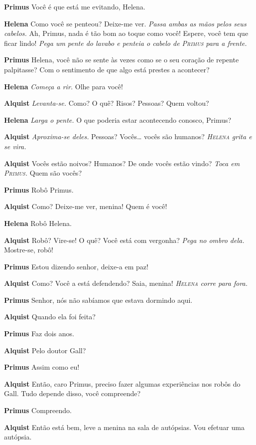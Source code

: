 \textbf{Primus} Você é que está me evitando, Helena.

\textbf{Helena} Como você se penteou? Deixe-me ver. \emph{Passa ambas as mãos pelos
seus cabelos.} Ah, Primus, nada é tão bom ao toque como você! Espere, você tem
que ficar lindo!
\emph{Pega um pente do lavabo e penteia o cabelo de \textsc{Primus} para a frente.}

\textbf{Primus} Helena, você não se sente às vezes como se o seu coração de repente palpitasse?
Com o sentimento de que algo está prestes a acontecer?

\textbf{Helena} \emph{Começa a rir.} Olhe para você!

\textbf{Alquist} \emph{Levanta-se.} Como? O quê? Risos? Pessoas? Quem voltou?

\textbf{Helena} \emph{Larga o pente.} O que poderia estar acontecendo conosco, Primus?

\textbf{Alquist} \emph{Aproxima-se deles.} Pessoas? Vocês\ldots{} vocês são
humanos?
\emph{\textsc{Helena} grita e se vira.}

\textbf{Alquist} Vocês estão noivos? Humanos? De onde vocês estão vindo? \emph{Toca em
\textsc{Primus}.} Quem são vocês?

\textbf{Primus} Robô Primus.

\textbf{Alquist} Como? Deixe-me ver, menina! Quem é você!

\textbf{Helena} Robô Helena.

\textbf{Alquist} Robô? Vire-se! O quê? Você está com vergonha? \emph{Pega no ombro
dela.} Mostre-se, robô!

\textbf{Primus} Estou dizendo senhor, deixe-a em paz!

\textbf{Alquist} Como? Você a está defendendo? Saia, menina!
\emph{\textsc{Helena} corre para fora.}

\textbf{Primus} Senhor, nós não sabíamos que estava dormindo aqui.

\textbf{Alquist} Quando ela foi feita?

\textbf{Primus} Faz dois anos.

\textbf{Alquist} Pelo doutor Gall?

\textbf{Primus} Assim como eu!

\textbf{Alquist} Então, caro Primus, preciso fazer algumas experiências nos
robôs do Gall. Tudo depende disso, você compreende?

\textbf{Primus} Compreendo.

\textbf{Alquist} Então está bem, leve a menina na sala de autópsias. Vou efetuar uma
autópsia.

